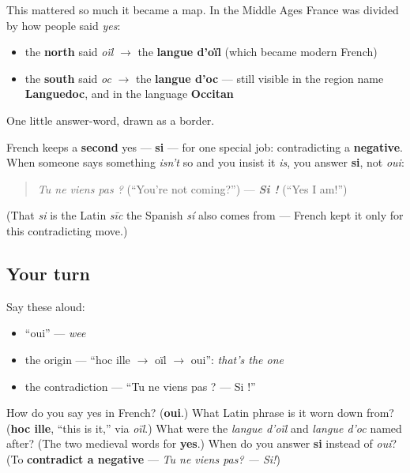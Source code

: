 \begin{culture}
This mattered so much it became a map. In the Middle Ages France was divided by how people said \emph{yes}:

\begin{itemize}
\raggedright
  \item the \textbf{north} said \emph{oïl} $\to$ the \textbf{langue d'oïl} (which became modern French)
  \item the \textbf{south} said \emph{oc} $\to$ the \textbf{langue d'oc} — still visible in the region name \textbf{Languedoc}, and in the language \textbf{Occitan}
\end{itemize}

One little answer-word, drawn as a border.
\end{culture}

\begin{grammarlens}[title={Grammar Lens: The other “yes,” si}]
French keeps a \textbf{second} yes — \textbf{si} — for one special job: contradicting a \textbf{negative}. When someone says something \emph{isn't} so and you insist it \emph{is}, you answer \textbf{si}, not \emph{oui}:

\begin{quote}
\emph{Tu ne viens pas ?} (\textquotedblleft{}You're not coming?\textquotedblright{}) — \emph{\textbf{Si !}} (\textquotedblleft{}Yes I am!\textquotedblright{})
\end{quote}

(That \emph{si} is the Latin \emph{sīc} the Spanish \emph{sí} also comes from — French kept it only for this contradicting move.)
\end{grammarlens}

\subsection*{Your turn}
Say these aloud:

\begin{itemize}
\raggedright
  \item \textquotedblleft{}oui\textquotedblright{} — \emph{wee}
  \item the origin — \textquotedblleft{}hoc ille $\to$ oïl $\to$ oui\textquotedblright{}: \emph{that's the one}
  \item the contradiction — \textquotedblleft{}Tu ne viens pas ? — Si !\textquotedblright{}
\end{itemize}

\begin{tcolorbox}[breakable,colback=teal!4,colframe=teal!35!black,title={Before you move on}]
How do you say yes in French? (\textbf{oui}.) What Latin phrase is it worn down from? (\textbf{hoc ille}, \textquotedblleft{}this is it,\textquotedblright{} via \emph{oïl}.) What were the \emph{langue d'oïl} and \emph{langue d'oc} named after? (The two medieval words for \textbf{yes}.) When do you answer \textbf{si} instead of \emph{oui}? (To \textbf{contradict a negative} — \emph{Tu ne viens pas? — Si!})
\end{tcolorbox}
